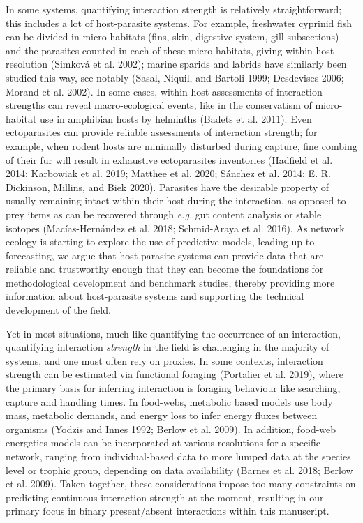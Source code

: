 \documentclass[10pt,oneside]{article}
\begin{document}
In some systems, quantifying interaction strength is relatively
straightforward; this includes a lot of host-parasite systems. For
example, freshwater cyprinid fish can be divided in micro-habitats
(fins, skin, digestive system, gill subsections) and the parasites
counted in each of these micro-habitats, giving within-host resolution
(Simková et al. 2002); marine sparids and labrids have similarly been
studied this way, see notably (Sasal, Niquil, and Bartoli 1999;
Desdevises 2006; Morand et al. 2002). In some cases, within-host
assessments of interaction strengths can reveal macro-ecological events,
like in the conservatism of micro-habitat use in amphibian hosts by
helminths (Badets et al. 2011). Even ectoparasites can provide reliable
assessments of interaction strength; for example, when rodent hosts are
minimally disturbed during capture, fine combing of their fur will
result in exhaustive ectoparasites inventories (Hadfield et al. 2014;
Karbowiak et al. 2019; Matthee et al. 2020; Sánchez et al. 2014; E. R.
Dickinson, Millins, and Biek 2020). Parasites have the desirable
property of usually remaining intact within their host during the
interaction, as opposed to prey items as can be recovered through
\emph{e.g.} gut content analysis or stable isotopes (Macías-Hernández et
al. 2018; Schmid-Araya et al. 2016). As network ecology is starting to
explore the use of predictive models, leading up to forecasting, we
argue that host-parasite systems can provide data that are reliable and
trustworthy enough that they can become the foundations for
methodological development and benchmark studies, thereby providing more
information about host-parasite systems and supporting the technical
development of the field.

Yet in most situations, much like quantifying the occurrence of an
interaction, quantifying interaction \emph{strength} in the field is
challenging in the majority of systems, and one must often rely on
proxies. In some contexts, interaction strength can be estimated via
functional foraging (Portalier et al. 2019), where the primary basis for
inferring interaction is foraging behaviour like searching, capture and
handling times. In food-webs, metabolic based models use body mass,
metabolic demands, and energy loss to infer energy fluxes between
organisms (Yodzis and Innes 1992; Berlow et al. 2009). In addition,
food-web energetics models can be incorporated at various resolutions
for a specific network, ranging from individual-based data to more
lumped data at the species level or trophic group, depending on data
availability (Barnes et al. 2018; Berlow et al. 2009). Taken together,
these considerations impose too many constraints on predicting
continuous interaction strength at the moment, resulting in our primary
focus in binary present/absent interactions within this manuscript.
\end{document}
